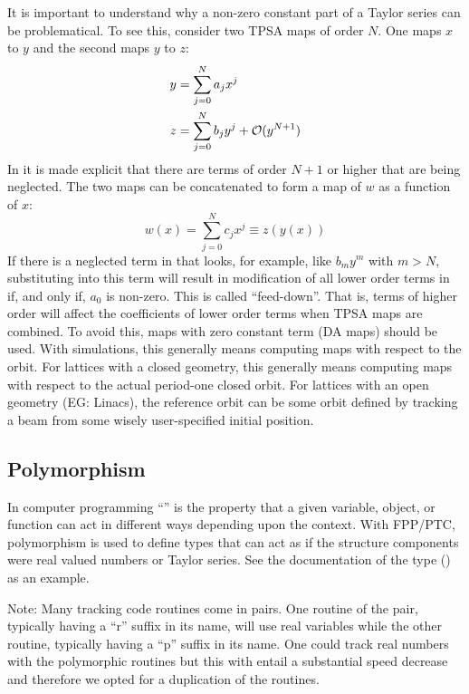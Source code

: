 \documentclass{hitec}     %
\begin{document}
{{{It is important to understand why a non-zero constant part of a Taylor series can be
problematical. To see this, consider two TPSA maps of order $N$. One maps $x$ to $y$ and the second
maps $y$ to $z$:
\begin{align}
  y &= \sum_{j = 0}^N a_j x^j  \label{yj0n} \\
  z &= \sum_{j = 0}^N b_j y^j + {\cal O}(y^{N+1}) \label{zj0n}
\end{align}
In  it is made explicit that there are terms of order $N+1$ or higher that are being neglected.
The two maps can be concatenated to form a map of {\color{h}$w$ as a function of $x$:
\begin{equation}
  w\left({x}\right) = \sum_{j = 0}^N c_j x^j
\equiv z\left({y\left({x}\right)}\right)
  \label{zj0nc}
\end{equation}
}
If there is a neglected term in  that looks, for example, like $b_m y^m$ with $m > N$, substituting
 into this term will result in modification of all lower order terms in  if, and
only if, $a_0$ is non-zero. This is
called ``feed-down''. That is, terms of higher order will affect the coefficients of lower order
terms when TPSA maps are combined. To avoid this, maps with zero constant term (DA maps) should be used. With
simulations, this generally means computing maps with respect to the   orbit. For
lattices with a closed geometry, this generally means computing maps with respect to the {\color{h} actual period-one closed} 
orbit. For lattices with an open geometry (EG: Linacs), the reference orbit can be some orbit
defined by tracking a beam from some {\color{h} wisely } user-specified initial position.

\subsection{Polymorphism}
\label{s:poly}

In computer programming ``'' is the property that a given variable, object, or
function can act in different ways depending upon the context. With FPP/PTC, polymorphism is used to
define types that can act as if the structure components were real valued numbers or Taylor series.
See the documentation of the  type () as an example.

Note: Many  tracking code routines come in pairs. One routine of the pair, typically having a 
``r'' suffix in its name, will use real variables while the other routine, typically having a ``p'' suffix 
in its name. {\color{h} One could track real numbers with the polymorphic routines but this with entail a substantial speed decrease and therefore we opted for a duplication of the routines.}

}}}
\end{document}
